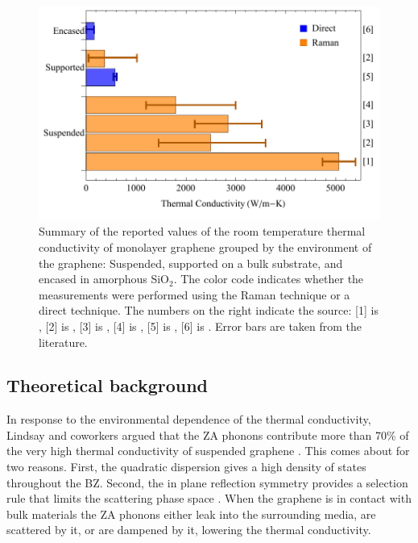 \begin{figure}
	\begin{center}
	\includegraphics{Figs_Thermal/Thermal_lit.pdf}
	\end{center}
	\caption[Environmental dependence of graphene's thermal conductivity]{
	\label{fig:therm:lit}
		Summary of the reported values of the room temperature thermal conductivity of monolayer graphene grouped by the environment of the graphene: Suspended, supported on a bulk substrate, and encased in amorphous SiO$_2$.
		The color code indicates whether the measurements were performed using the Raman technique or a direct technique.
		The numbers on the right indicate the source: [1] is \cite{Balandin2008}, [2] is \cite{Cai2010}, [3] is \cite{Chen2011a}, [4] is \cite{Lee2011}, [5] is \cite{Seol2010}, [6] is \cite{Jang2010}.
		Error bars are taken from the literature.
	}
\end{figure}

\subsection{Theoretical background}
In response to the environmental dependence of the thermal conductivity, Lindsay and coworkers argued that the ZA phonons contribute more than 70\% of the very high thermal conductivity of suspended graphene \cite{Seol2010}.
This comes about for two reasons.
First, the quadratic dispersion gives a high density of states throughout the BZ.
Second, the in plane reflection symmetry provides a selection rule that limits the scattering phase space \cite{Lindsay2010}.
When the graphene is in contact with bulk materials the ZA phonons either leak into the surrounding media, are scattered by it, or are dampened by it, lowering the thermal conductivity.

